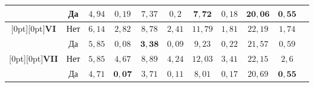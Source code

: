 \begin{table}
{\begin{center}
\begin{tabular}{|c|c|c|c|c|c|c|c|c|c|c|}
&Да&$4{,}94$&$0{,}19$&$7{,}37$&$0{,}2$\hphantom{9}&\hphantom{9}$\mathbf{7{,}72}$&$0{,}18$&$\mathbf{20{,}06}$&$\mathbf{0{,}55}$\\
\hline
\multicolumn{1}{|c|}{\raisebox{-6pt}[0pt][0pt]{{\bf VI}}}&Нет&$6{,}14$&$2{,}82$&$8{,}78$&$2{,}41$&$11{,}79$&$1{,}81$&$22{,}19$&$1{,}74$\\
&Да&$5{,}85$&$0{,}08$&$\mathbf{3{,}38}$&$0{,}09$&\hphantom{9}$9{,}23$&$0{,}22$&$21{,}57$&$0{,}59$\\
\hline
\multicolumn{1}{|c|}{\raisebox{-6pt}[0pt][0pt]{{\bf VII}}}&
Нет&$5{,}85$&$4{,}67$&$8{,}89$&$4{,}24$&$12{,}03$&$3{,}41$&$22{,}15$&$2{,}6$\hphantom{9}\\
&Да&$4{,}71$&$\mathbf {0{,}07}$&$3{,}71$&$0{,}11$&\hphantom{9}$8{,}01$&$0{,}17$&$20{,}69$&
$\mathbf{0{,}55}$\\
\hline
\end{tabular}
\end{center}}
\renewcommand{\tablename}{\protect\bf Рис.}
\setcounter{table}{2}
\vspace*{1pt}
    \begin{center}  
  \mbox{%
 \epsfxsize=104.157mm 
 }
\end{center}
\vspace*{-14pt}
\label{FigLoss}
\vspace*{-1pt}
\end{table}

\renewcommand{\figurename}{\protect\bf Рис.}
\renewcommand{\tablename}{\protect\bf Таблица}
\setcounter{figure}{3}
\setcounter{table}{1}

